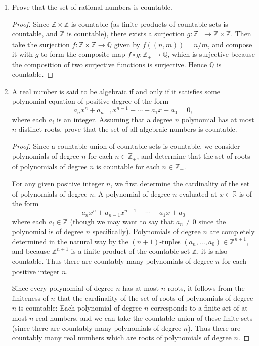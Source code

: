 \documentclass[11pt]{article}
\begin{document}
\begin{enumerate}
\begin{proof}
        So let $A$ be nonempty and countable, so that there exists a surjective map $g\colon \mathbb{Z}_+ \to A$. Then the composition $f\circ g\colon \mathbb{Z}_+\to B$ is surjective since the composition of surjective maps is surjective, and so in all cases $B$ is countable.
    \end{proof}
    \item Prove that the set of rational numbers is countable.
    \begin{proof}
        Since $\mathbb{Z}\times \mathbb{Z}$ is countable (as finite products of countable sets is countable, and $\mathbb{Z}$ is countable), there exists a surjection $g\colon \mathbb{Z}_+\to \mathbb{Z}\times\mathbb{Z}$. Then take the surjection $f\colon \mathbb{Z}\times\mathbb{Z}\to \mathbb{Q}$ given by $f((n,m)) = n/m$, and compose it with $g$ to form the composite map $f\circ g\colon \mathbb{Z}_+ \to \mathbb{Q}$, which is surjective because the composition of two surjective functions is surjective. Hence $\mathbb{Q}$ is countable.
    \end{proof}
    \item A real number is said to be algebraic if and only if it satisfies some polynomial equation of positive degree of the form \[a_nx^n + a_{n-1}x^{n-1} + \cdots + a_1x + a_0 = 0,\] where each $a_i$ is an integer. Assuming that a degree $n$ polynomial has at most $n$ distinct roots, prove that the set of all algebraic numbers is countable.
    \begin{proof}
        Since a countable union of countable sets is countable, we consider polynomials of degree $n$ for each $n\in \mathbb{Z}_+$, and determine that the set of roots of polynomials of degree $n$ is countable for each $n\in\mathbb{Z}_+$.

        For any given positive integer $n$, we first determine the cardinality of the set of polynomials of degree $n$. A polynomial of degree $n$ evaluated at $x\in\mathbb{R}$ is of the form \[a_nx^n + a_{n-1}x^{n-1} + \cdots + a_1x + a_0\] where each $a_i\in \mathbb{Z}$ (though we may want to say that $a_n\neq 0$ since the polynomial is of degree $n$ specifically). Polynomials of degree $n$ are completely determined in the natural way by the $(n+1)$-tuples $(a_n, \dots, a_0)\in \mathbb{Z}^{n+1}$, and because $\mathbb{Z}^{n+1}$ is a finite product of the countable set $\mathbb{Z}$, it is also countable. Thus there are countably many polynomials of degree $n$ for each positive integer $n$.

        Since every polynomial of degree $n$ has at most $n$ roots, it follows from the finiteness of $n$ that the cardinality of the set of roots of polynomials of degree $n$ is countable: Each polynomial of degree $n$ corresponds to a finite set of at most $n$ real numbers, and we can take the countable union of these finite sets (since there are countably many polynomials of degree $n$). Thus there are countably many real numbers which are roots of polynomials of degree $n$.


\end{proof}
\end{enumerate}
\end{document}
